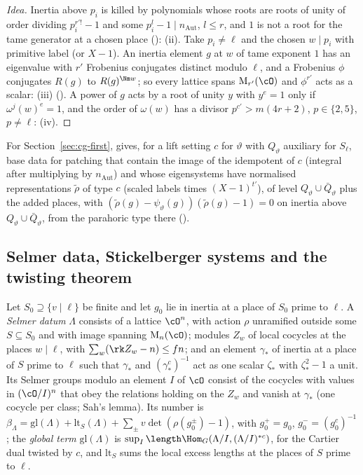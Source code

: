 \begin{proof}[Idea]
Inertia above $p_i$ is killed by polynomials whose roots are roots of unity of order dividing
$p_i^{r'!}-1$ and some $p_i^l-1\mid n_{\mathrm{Aut}}$, $l\le r$, and $1$ is not a root for the tame generator at a
chosen place (): (ii). Take $p_i\ne\ell$ and
the chosen $w\mid p_i$ with primitive label (or $X-1$). An inertia element $g$ at $w$ of tame exponent
$1$ has an eigenvalue with $r'$ Frobenius conjugates distinct modulo $\ell$, and a Frobenius $\phi$
conjugates $R(g)$ to $R(g)^{\Nm w}$; so every lattice spans $\mathrm M_{r'}(\cO)$ and $\phi^{r'}$ acts as a
scalar: (iii) (). A power of
$g$ acts by a root of unity $y$ with $y^e=1$ only if $\omega^j(w)^e=1$, and the order of $\omega(w)$
has a divisor $p^{c'}>m(4r+2)$, $p\in\{2,5\}$, $p\ne\ell$: (iv).
\end{proof}

For Section~\ref{sec:cg-first},  gives, for a lift setting $c$ for
$\vartheta$ with $Q_\vartheta$ auxiliary for $S_\ell$, base data for patching that contain the image
of the idempotent of $c$ (integral after multiplying by $n_{\mathrm{Aut}}$) and whose eigensystems have normalised
representations $\tilde\rho$ of type $c$ (scaled labels times $(X-1)^{t'}$), of level $Q_\vartheta\cup\bar
Q_\vartheta$ plus the added places, with $(\tilde\rho(g)-\psi_\vartheta(g))(\tilde\rho(g)-1)=0$ on inertia above
$Q_\vartheta\cup\bar Q_\vartheta$, from the parahoric type there ().

\subsection{Selmer data, Stickelberger systems and the twisting theorem}
\label{cg-selmer:sec:twisting}

\begin{definition}\label{cg-selmer:def:datum}
Let $S_0\supseteq\{v\mid\ell\}$ be finite and let $g_0$ lie in inertia at a place of $S_0$ prime to
$\ell$. A \emph{Selmer datum} $\Lambda$ consists of a lattice $\cO^n$, with action $\rho$ unramified outside
some $S\subseteq S_0$ and with image spanning $\mathrm M_n(\cO)$; modules $Z_w$ of local cocycles at the
places $w\mid\ell$, with $\sum_w(\rk Z_w-n)\le fn$; and an element $\gamma_*$ of inertia at a place
of $S$ prime to $\ell$ such that $\gamma_*$ and $(\gamma_*^c)^{-1}$ act as one scalar $\zeta_*$ with
$\zeta_*^2-1$ a unit. Its Selmer groups modulo an element $I$ of $\cO$ consist of the cocycles with values
in $(\cO/I)^n$ that obey the relations holding on the $Z_w$ and vanish at $\gamma_*$ (one cocycle
per class; Sah's lemma). Its number is $\beta_\Lambda=\mathrm{gl}(\Lambda)+\mathrm{lt}_S(\Lambda)+\sum_\pm
v\det(\rho(g_0^\pm)-1)$, with $g_0^+=g_0$, $g_0^-=(g_0^c)^{-1}$; the \emph{global term}
$\mathrm{gl}(\Lambda)$ is $\sup_I\length\Hom_G(\Lambda/I,(\Lambda/I)^{*c})$, for the Cartier dual twisted by $c$, and
$\mathrm{lt}_S$ sums the local excess lengths at the places of $S$ prime to $\ell$.
\end{definition}

